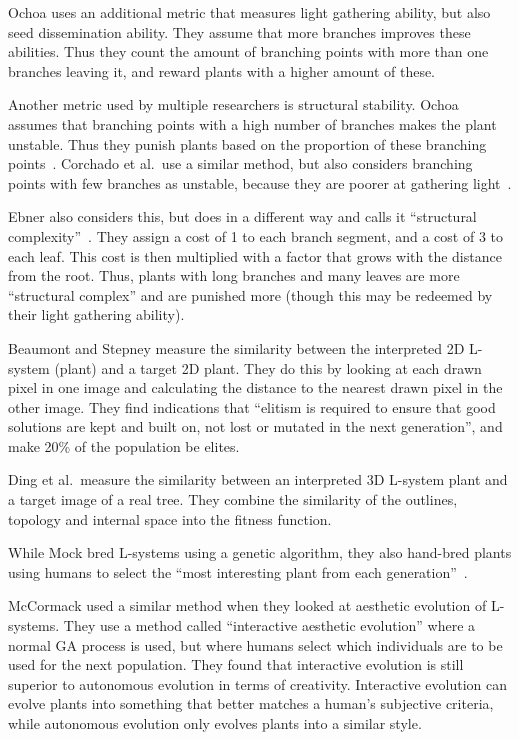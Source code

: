 Ochoa uses an additional metric that measures light gathering ability, but also seed dissemination ability.
They assume that more branches improves these abilities.
Thus they count the amount of branching points with more than one branches leaving it, and reward plants with a higher amount of these.~\cite{1998Ochoa}

Another metric used by multiple researchers is structural stability.
Ochoa assumes that branching points with a high number of branches makes the plant unstable.
Thus they punish plants based on the proportion of these branching points~\cite{1998Ochoa}.
Corchado et al.\ use a similar method, but also considers branching points with few branches as unstable, because they are poorer at gathering light~\cite{2009Corchado}.

Ebner also considers this, but does in a different way and calls it ``structural complexity''~\cite{2003Ebner}.
They assign a cost of 1 to each branch segment, and a cost of 3 to each leaf.
This cost is then multiplied with a factor that grows with the distance from the root.
Thus, plants with long branches and many leaves are more ``structural complex'' and are punished more (though this may be redeemed by their light gathering ability).

Beaumont and Stepney measure the similarity between the interpreted 2D L-system (plant) and a target 2D plant.
They do this by looking at each drawn pixel in one image and calculating the distance to the nearest drawn pixel in the other image.
They find indications that ``elitism is required to ensure that good solutions are kept and built on, not lost or mutated in the next generation'', and make 20\% of the population be elites.~\cite{2009Beaumont}

Ding et al.\ measure the similarity between an interpreted 3D L-system plant and a target image of a real tree.
They combine the similarity of the outlines, topology and internal space into the fitness function.~\cite{2013Ding}

While Mock bred L-systems using a genetic algorithm, they also hand-bred plants using humans to select the ``most interesting plant from each generation''~\cite{1998Mock}.

McCormack used a similar method when they looked at aesthetic evolution of L-systems.
They use a method called ``interactive aesthetic evolution'' where a normal GA process is used, but where humans select which individuals are to be used for the next population.
They found that interactive evolution is still superior to autonomous evolution in terms of creativity.
Interactive evolution can evolve plants into something that better matches a human's subjective criteria, while autonomous evolution only evolves plants into a similar style.~\cite{2004McCormack}

